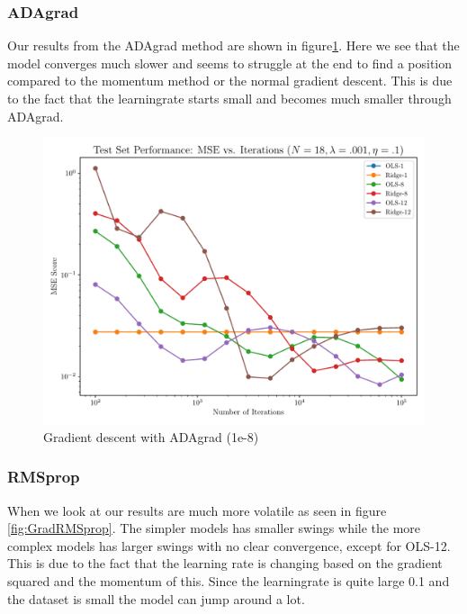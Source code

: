 \documentclass[amssymb,twocolumn,aps]{revtex4}
\begin{document}
\subsubsection{ADAgrad}

Our results from the ADAgrad method are shown in figure\ref{fig:GradADAgrad}.
Here we see that the model converges much slower and seems to struggle at the end to find a position compared to the momentum method or the normal gradient descent.
This is due to the fact that the learningrate starts small and becomes much smaller through ADAgrad.
\\

\begin{figure}[h]
    \centering
    \includegraphics[width=.95 \linewidth]{Figures/OLS_Ridge_ADAgrad.pdf}
    \caption{Gradient descent with ADAgrad (1e-8)}
    \label{fig:GradADAgrad}
\end{figure}


\subsubsection{RMSprop}

When we look at our results are much more volatile as seen in figure \ref{fig:GradRMSprop}.
The simpler models has smaller swings while the more complex models has larger swings with no clear convergence, except for OLS-12. 
This is due to the fact that the learning rate is changing based on the gradient squared and the momentum of this.
Since the learningrate is quite large 0.1 and the dataset is small the model can jump around a lot.
\\
\end{document}
